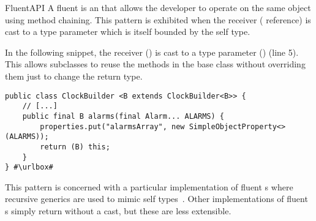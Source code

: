 \begin{pattern}{FluentAPI}
A fluent \api{} is an \api{} that allows the developer to operate on the same
object using method chaining.
This pattern is exhibited when the receiver ( reference) is cast to a type parameter
  which is itself bounded by the self type.


\instances{}
In the following snippet,%
\def\urlvar{http://bit.ly/HanSolo_Medusa_2TyBObH}
the receiver () is cast to a type parameter () (line 5).
This allows subclasses to reuse the methods in the base class without overriding them just to change the return type.

\begin{verbatim}
public class ClockBuilder <B extends ClockBuilder<B>> {
    // [...]
    public final B alarms(final Alarm... ALARMS) {
        properties.put("alarmsArray", new SimpleObjectProperty<>(ALARMS));
        return (B) this;
    }
} #\urlbox#
\end{verbatim}

\issues{}
  This pattern is concerned with a particular implementation of fluent \api{}s
  where recursive generics are used to mimic self
  types~\cite{bruceChallengingTypingIssues2003}.
  Other implementations of fluent \api{}s simply return  without a
  cast, but these are less extensible.

\end{pattern}
